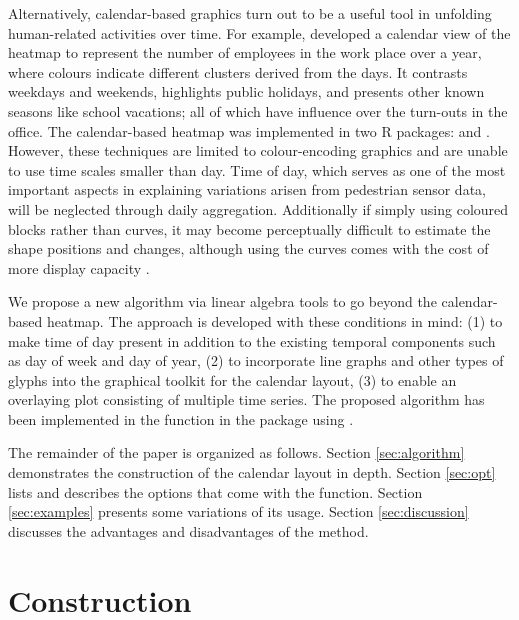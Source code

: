 \documentclass[article]{jss}
\theoremstyle{definition}
\theoremstyle{definition}
\theoremstyle{remark}
\begin{document}
Alternatively, calendar-based graphics turn out to be a useful tool in
unfolding human-related activities over time. For example,
\citet{VanWijkCluster1999} developed a calendar view of the heatmap to
represent the number of employees in the work place over a year, where
colours indicate different clusters derived from the days. It contrasts
weekdays and weekends, highlights public holidays, and presents other
known seasons like school vacations; all of which have influence over
the turn-outs in the office. The calendar-based heatmap was implemented
in two R packages:  \citep{R-ggTimeSeries} and
 \citep{R-ggcal}. However, these techniques are limited to
colour-encoding graphics and are unable to use time scales smaller than
day. Time of day, which serves as one of the most important aspects in
explaining variations arisen from pedestrian sensor data, will be
neglected through daily aggregation. Additionally if simply using
coloured blocks rather than curves, it may become perceptually difficult
to estimate the shape positions and changes, although using the curves
comes with the cost of more display capacity
\citep{cleveland1984graphical, lam2007overview}.

We propose a new algorithm via linear algebra tools to go beyond the
calendar-based heatmap. The approach is developed with these conditions
in mind: (1) to make time of day present in addition to the existing
temporal components such as day of week and day of year, (2) to
incorporate line graphs and other types of glyphs into the graphical
toolkit for the calendar layout, (3) to enable an overlaying plot
consisting of multiple time series. The proposed algorithm has been
implemented in the  function in the 
package \citep{R-sugrrants} using  \citep{R-base}.

The remainder of the paper is organized as follows. Section
\ref{sec:algorithm} demonstrates the construction of the calendar layout
in depth. Section \ref{sec:opt} lists and describes the options that
come with the  function. Section \ref{sec:examples}
presents some variations of its usage. Section \ref{sec:discussion}
discusses the advantages and disadvantages of the method.

\section{Construction}\label{construction}

\label{sec:algorithm}
\end{document}

